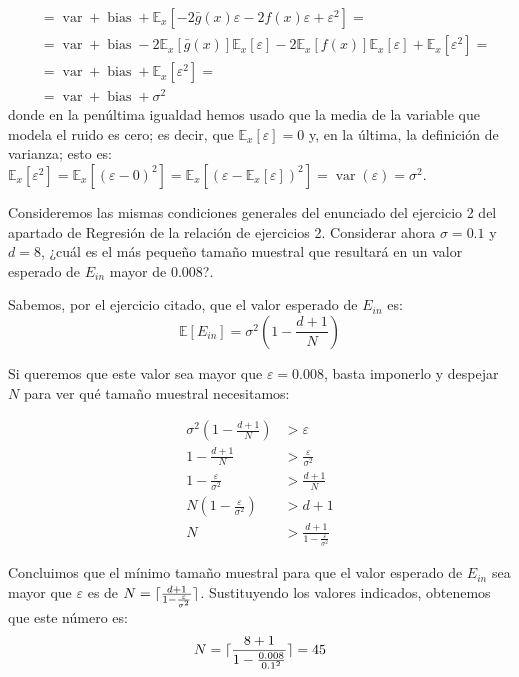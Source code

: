\documentclass[a4paper, 11pt]{article}
\begin{document}
\begin{solucion}
\begin{align*}
              &= \operatorname{var} + \operatorname{bias} + \mathbb{E}_x[-2\bar{g}(x)\varepsilon - 2f(x)\varepsilon + \varepsilon^2] = \\
              &= \operatorname{var} + \operatorname{bias} - 2 \mathbb{E}_x[\bar{g}(x)]\mathbb{E}_x[\varepsilon] - 2\mathbb{E}_x[f(x)]\mathbb{E}_x[\varepsilon] + \mathbb{E}_x[\varepsilon^2] =\\
              &= \operatorname{var} + \operatorname{bias} + \mathbb{E}_x[\varepsilon^2] =\\
              &= \operatorname{var} + \operatorname{bias} + \sigma^2
          \end{align*}
          donde en la penúltima igualdad hemos usado que la media de la variable que modela el ruido es cero; es decir, que $\mathbb{E}_x[\varepsilon] = 0$ y, en la última, la definición de varianza; esto es: $\mathbb{E}_x[\varepsilon^2] = \mathbb{E}_x[(\varepsilon - 0)^2] = \mathbb{E}_x[(\varepsilon - \mathbb{E}_x[\varepsilon])^2] = \operatorname{var}(\varepsilon) = \sigma^2$.
      \end{solucion}

      \begin{ejercicio}
        \item  Consideremos las mismas condiciones generales del enunciado del ejercicio 2 del apartado de Regresión de la relación de ejercicios 2.
        Considerar ahora $\sigma=0.1$ y $d=8$, ¿cuál es el más pequeño tamaño muestral que resultará en un valor esperado de $E_{in}$ mayor de $0.008$?.
      \end{ejercicio}


      \begin{solucion}
        Sabemos, por el ejercicio citado, que el valor esperado de $E_{in}$ es:
        \[
        \mathbb{E}[E_{in}] = \sigma^2\left(1 - \frac{d+1}{N}\right)
        \]

        Si queremos que este valor sea mayor que $\varepsilon = 0.008$, basta imponerlo y despejar $N$ para ver qué tamaño muestral necesitamos:

        \begin{align*}
            \sigma^2\left(1 - \frac{d+1}{N}\right) &> \varepsilon \\
            1 - \frac{d+1}{N} &> \frac{\varepsilon}{\sigma^2} \\
            1 - \frac{\varepsilon}{\sigma^2} &> \frac{d+1}{N} \\
            N \left(1 - \frac{\varepsilon}{\sigma^2}\right) &> d+1 \\
            N &> \frac{d+1}{1 - \frac{\varepsilon}{\sigma^2}}
        \end{align*}

        Concluimos que el mínimo tamaño muestral para que el valor esperado de $E_{in}$ sea mayor que $\varepsilon$ es de $N = \lceil\frac{d+1}{1 - \frac{\varepsilon}{\sigma^2}}\rceil$. Sustituyendo los valores indicados, obtenemos que este número es:
        \[
        N = \lceil\frac{8+1}{1 - \frac{0.008}{0.1^2}}\rceil = 45
        \]
      \end{solucion}
\end{document}
